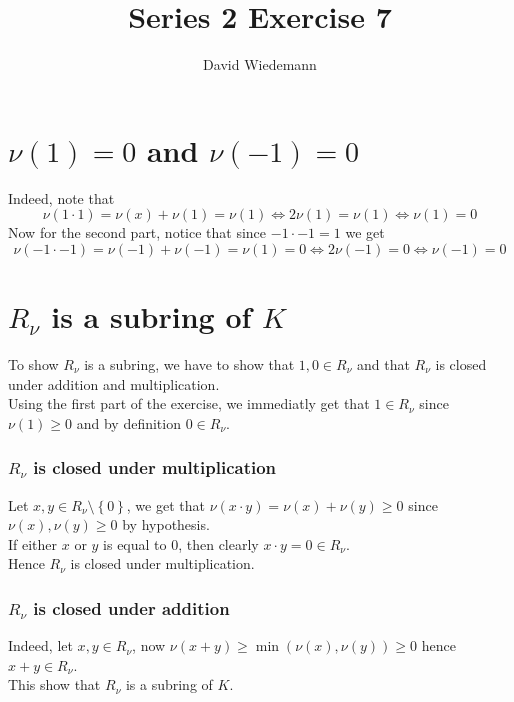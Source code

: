 \documentclass[11pt, a4paper]{article}
\begin{document}
\title{Series 2 Exercise 7}
\author{David Wiedemann}
\maketitle
\section*{$\nu( 1) = 0$ and $\nu( -1) =0$  }
Indeed, note that 
\[ 
\nu( 1\cdot 1) = \nu( x) +\nu( 1) = \nu(1) \iff 2\nu( 1) =\nu( 1) \iff \nu( 1) =0
\]
Now for the second part, notice that since $-1\cdot -1 = 1$ we get
\[ 
\nu( -1\cdot -1) = \nu( -1) +\nu( -1) = \nu( 1) = 0\iff 2\nu( -1) =0 \iff \nu( -1) =0
\]
\section*{$R_\nu$ is a subring of $K$ }
To show $R_\nu$ is a subring, we have to show that $  1,0\in R_{\nu} $ and that $R_\nu$  is closed under addition and multiplication.\\

Using the first part of the exercise, we immediatly get that $1\in R_\nu$ since $\nu( 1) \geq 0$  and by definition $0\in R_\nu$.\\
\subsubsection*{ $R_\nu$ is closed under multiplication}
Let $x,y \in R_\nu\setminus \left\{ 0 \right\} 	$, we get that $\nu( x\cdot y) = \nu( x) +\nu( y) \geq 0$ since $\nu( x) ,\nu( y) \geq 0$ by hypothesis.\\
If either $x$ or $y$ is equal to 0, then clearly $x\cdot y = 0\in R_\nu.$\\
Hence $R_\nu$ is closed under multiplication.
\subsubsection*{ $R_\nu$ is closed under addition}
Indeed, let $x,y\in R_\nu$, now $ \nu( x+y) \geq \min ( \nu( x) ,\nu( y) ) \geq 0$ hence $x+y\in R_\nu$.\\

This show that $R_\nu$ is a subring of $K$.
\end{document}
